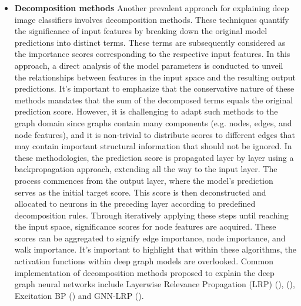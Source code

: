 \documentclass[binding=0.6cm]{sapthesis}
\newcommand{\mycite}[1]{(\cite{#1})}
\begin{document}
\begin{itemize}
    \item \textbf{Decomposition methods} Another prevalent approach for explaining deep image classifiers involves decomposition methods. These techniques quantify the significance of input features by breaking down the original model predictions into distinct terms. These terms are subsequently considered as the importance scores corresponding to the respective input features. In this approach, a direct analysis of the model parameters is conducted to unveil the relationships between features in the input space and the resulting output predictions. It's important to emphasize that the conservative nature of these methods mandates that the sum of the decomposed terms equals the original prediction score. However, it is challenging to adapt such methods to the graph domain since graphs contain many components (e.g. nodes, edges, and node features), and it is non-trivial to distribute scores to different edges that may contain important structural information that should not be ignored. In these methodologies, the prediction score is propagated layer by layer using a backpropagation approach, extending all the way to the input layer. The process commences from the output layer, where the model's prediction serves as the initial target score. This score is then deconstructed and allocated to neurons in the preceding layer according to predefined decomposition rules. Through iteratively applying these steps until reaching the input space, significance scores for node features are acquired. These scores can be aggregated to signify edge importance, node importance, and walk importance. It's important to highlight that within these algorithms, the activation functions within deep graph models are overlooked. Common implementation of decomposition methods proposed to explain the deep graph neural networks include Layerwise Relevance Propagation (LRP) \mycite{baldassarre2019-explainability}, \mycite{schwarzenberg2019-layerwise}, Excitation BP \mycite{pope2019-CVPR} and GNN-LRP \mycite{schnake2022-high-order}.
    
\end{itemize}
\end{document}
